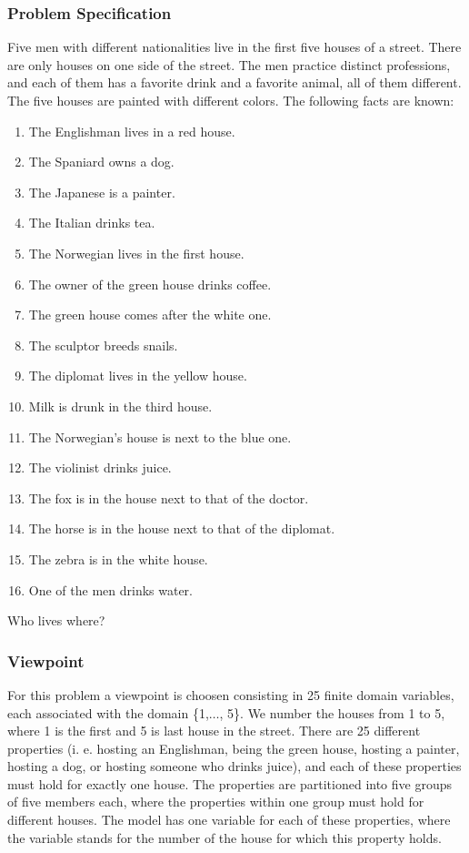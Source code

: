 \documentclass[a4paper,halfparskip]{scrartcl}
\begin{document}
\subsubsection{Problem Specification}
Five men with different nationalities live in the first five 
houses of a street. There are only houses on one side of the street. 
The men practice distinct professions, and each of them has a favorite 
drink and a favorite animal, all of them different. The five houses are 
painted with different colors. The following facts are known: 
\begin{enumerate}
\item
The Englishman lives in a red house.
\item
The Spaniard owns a dog.
\item
The Japanese is a painter.
\item
The Italian drinks tea.
\item
The Norwegian lives in the first house.
\item
The owner of the green house drinks coffee.
\item
The green house comes after the white one.
\item
The sculptor breeds snails.
\item
The diplomat lives in the yellow house.
\item
Milk is drunk in the third house.
\item
The Norwegian's house is next to the blue one.
\item
The violinist drinks juice.
\item
The fox is in the house next to that of the doctor.
\item
The horse is in the house next to that of the diplomat.
\item
The zebra is in the white house.
\item
One of the men drinks water.
\end{enumerate}
Who lives where? 


\subsubsection{Viewpoint}
For this problem a viewpoint is choosen consisting in 25
finite domain variables, each associated with the domain \{1,$\ldots$, 5\}.
We number the houses from 1 to 5, where 1 is the first and 5 
is last house in the street. There are 25 different properties 
(i. e. hosting an Englishman, being the green house, hosting a painter, 
hosting a dog, or hosting someone who drinks juice), and each 
of these properties must hold for exactly one house. The properties 
are partitioned into five groups of five members each, where the 
properties within one group must hold for different houses. The model 
has one variable for each of these properties, where the variable 
stands for the number of the house for which this property holds. 
\end{document}
